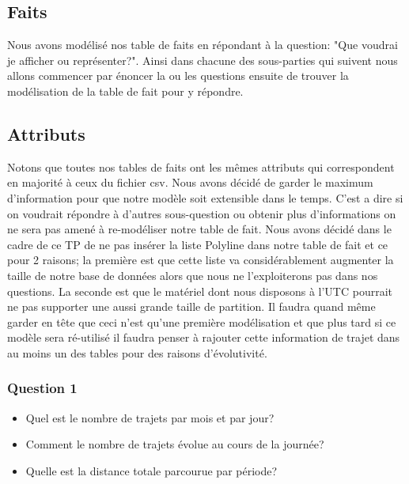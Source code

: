 \documentclass[]{report}
\begin{document}
	\subsection{Faits}
	Nous avons modélisé nos table de faits en répondant à la question: "Que voudrai je afficher ou représenter?". Ainsi dans chacune des sous-parties qui suivent nous allons commencer par énoncer la ou les  questions ensuite de trouver la modélisation de la table de fait pour y répondre. \\
	\subsection{Attributs}
	Notons que toutes nos tables de faits ont les mêmes attributs qui correspondent en majorité à ceux du fichier csv. Nous avons décidé de garder le maximum d'information pour que notre modèle soit extensible dans le temps. C'est a dire si on voudrait répondre à d'autres sous-question ou obtenir plus d'informations on ne sera pas amené à re-modéliser notre table de fait. Nous avons décidé dans le cadre de ce TP de ne pas insérer la liste Polyline dans notre table de fait et ce pour 2 raisons; la première est que cette liste va considérablement augmenter la taille de notre base de données alors que nous ne l'exploiterons pas dans nos questions. La seconde est que  le matériel dont nous disposons à l'UTC pourrait ne pas supporter une aussi grande taille de partition. Il faudra quand même  garder en tête que ceci n'est qu'une première modélisation et que plus tard si ce modèle sera ré-utilisé il faudra penser à rajouter cette information de trajet dans au moins un des tables pour des raisons d'évolutivité.
	\subsubsection{Question 1}
	\begin{itemize}
		\item Quel est le nombre de trajets par mois et par jour?
		\item Comment le nombre de trajets évolue au cours de la journée?
		\item Quelle est la distance totale parcourue par période?
	\end{itemize}
	
\end{document}
